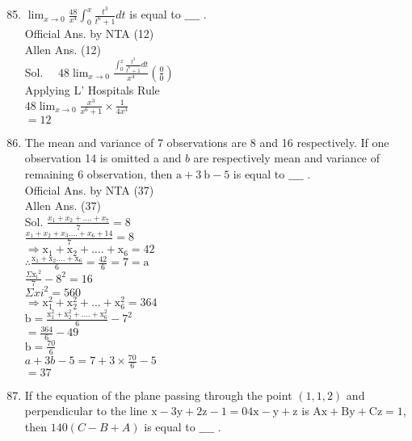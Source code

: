 \documentclass[10pt]{article}
\begin{document}
\begin{enumerate}
  \setcounter{enumi}{84}
  \item \(\lim _{x \rightarrow 0} \frac{48}{x^{4}} \int_{0}^{x} \frac{t^{3}}{t^{6}+1} d t\) is equal to \(\_\_\_\_\) .\\
Official Ans. by NTA (12)\\
Allen Ans. (12)\\
Sol. \(\quad 48 \lim _{x \rightarrow 0} \frac{\int_{0}^{x} \frac{t^{3}}{t^{6}+1} d t}{x^{4}}\left(\frac{0}{0}\right)\)\\
Applying L' Hospitals Rule\\
\(48 \lim _{x \rightarrow 0} \frac{x^{3}}{x^{6}+1} \times \frac{1}{4 x^{3}}\)\\
\(=12\)
  \item The mean and variance of 7 observations are 8 and 16 respectively. If one observation 14 is omitted a and \(b\) are respectively mean and variance of remaining 6 observation, then \(\mathrm{a}+3 \mathrm{~b}-5\) is equal to \(\_\_\_\_\) .\\
Official Ans. by NTA (37)\\
Allen Ans. (37)\\
Sol. \(\frac{x_{1}+x_{2}+\ldots .+x_{7}}{7}=8\)\\
\(\frac{x_{1}+x_{2}+x_{3} \ldots .+x_{6}+14}{7}=8\)\\
\(\Rightarrow \mathrm{x}_{1}+\mathrm{x}_{2}+\ldots .+\mathrm{x}_{6}=42\)\\
\(\therefore \frac{\mathrm{x}_{1}+\mathrm{x}_{2} \ldots .+\mathrm{x}_{6}}{6}=\frac{42}{6}=7=\mathrm{a}\)\\
\(\frac{\Sigma \mathrm{x}_{\mathrm{i}}{ }^{2}}{7}-8^{2}=16\)\\
\(\Sigma x i^{2}=560\)\\
\(\Rightarrow \mathrm{x}_{1}^{2}+\mathrm{x}_{2}^{2}+\ldots+\mathrm{x}_{6}^{2}=364\)\\
\(\mathrm{b}=\frac{\mathrm{x}_{1}^{2}+\mathrm{x}_{2}^{2}+\ldots .+\mathrm{x}_{6}^{2}}{6}-7^{2}\)\\
\(=\frac{364}{6}-49\)\\
\(\mathrm{b}=\frac{70}{6}\)\\
\(a+3 b-5=7+3 \times \frac{70}{6}-5\)\\
\(=37\)
  \item If the equation of the plane passing through the point \((1,1,2)\) and perpendicular to the line \(\mathrm{x}-3 \mathrm{y}+2 \mathrm{z}-1=04 \mathrm{x}-\mathrm{y}+\mathrm{z}\) is \(\mathrm{Ax}+\mathrm{By}+\mathrm{Cz}=1\), then \(140(C-B+A)\) is equal to \(\_\_\_\_\) .
\end{enumerate}
\end{document}
